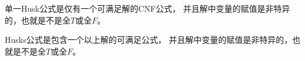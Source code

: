 \begin{definition}[单一Husk公式]\label{Singular-Husk-formula-definition}
单一Husk公式是仅有一个可满足解的CNF公式，
并且解中变量的赋值是非特异的，也就是不是全$T$或全$F$。
\end{definition}

\begin{definition}[Husks公式]\label{Husks-formula-definition}
Husks公式是包含一个以上解的可满足公式，
并且解中变量的赋值是非特异的，也就是不是全$T$或全$F$。
\end{definition}


